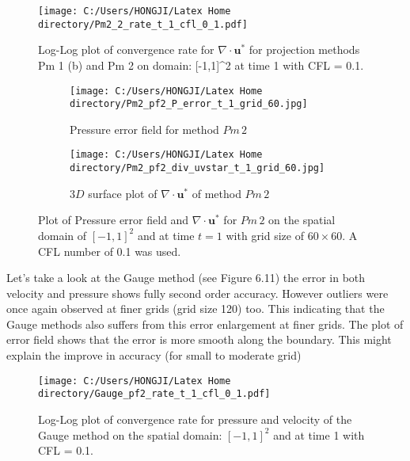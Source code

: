 \begin{figure}[H]
	\centering
	\texttt{[image: C:/Users/HONGJI/Latex Home directory/Pm2\_2\_rate\_t\_1\_cfl\_0\_1.pdf]}
	\caption{Log-Log plot of convergence rate for $\nabla \cdot \textbf{u}^*$ for projection methods Pm 1 (b) and Pm 2 on domain: [-1,1]^2 at time 1 with CFL = 0.1. }\label{fig:6.9}
\end{figure}

\begin{figure}[H]
	\centering
	\begin{subfigure}[t]{2.5in}
		\centering
		\texttt{[image: C:/Users/HONGJI/Latex Home directory/Pm2\_pf2\_P\_error\_t\_1\_grid\_60.jpg]}
		\caption{Pressure error field for method $Pm\,2$}\label{fig:6.10a}		
	\end{subfigure}
	\quad
	\begin{subfigure}[t]{2.5in}
		\centering
		\texttt{[image: C:/Users/HONGJI/Latex Home directory/Pm2\_pf2\_div\_uvstar\_t\_1\_grid\_60.jpg]}
		\caption{$3D$ surface plot of $\nabla \cdot \textbf{u}^*$ of method $Pm\,2$}\label{fig:6.10b}
	\end{subfigure}
	\caption{Plot of Pressure error field and $\nabla \cdot \textbf{u}^*$ for $Pm\,2$ on the spatial domain of $[-1,1]^2$ and at time $t=1$ with grid size of $60 \times 60$. A CFL number of 0.1 was used.}\label{fig:6.10}
\end{figure}

Let's take a look at the Gauge method (see Figure 6.11) the error in both velocity and pressure shows fully second order accuracy. However outliers were once again observed at finer grids (grid size 120) too. This indicating that the Gauge methods also suffers from this error enlargement at finer grids. The plot of error field shows that the error is more smooth along the boundary. This might explain the improve in accuracy (for small to moderate grid)

\begin{figure}[H]
	\centering
	\texttt{[image: C:/Users/HONGJI/Latex Home directory/Gauge\_pf2\_rate\_t\_1\_cfl\_0\_1.pdf]}
	\caption{Log-Log plot of convergence rate for pressure and velocity of the Gauge method on the spatial domain: $[-1,1]^2$ and at time 1 with CFL = 0.1. }\label{fig:6.11}
\end{figure}

